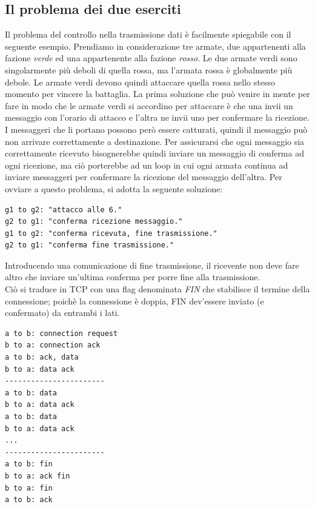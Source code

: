 \subsection{Il problema dei due eserciti}
Il problema del controllo nella trasmissione dati è facilmente spiegabile con il seguente esempio.
Prendiamo in considerazione tre armate, due appartenenti alla fazione \textit{verde} ed una appartenente alla fazione \textit{rosso}. Le due armate verdi sono singolarmente più deboli di quella rossa, ma l'armata rossa è globalmente più debole. Le armate verdi devono quindi attaccare quella rossa nello stesso momento per vincere la battaglia. La prima soluzione che può venire in mente per fare in modo che le armate verdi si accordino per attaccare è che una invii un messaggio con l'orario di attacco e l'altra ne invii uno per confermare la ricezione.\\
I messaggeri che li portano possono però essere catturati, quindi il messaggio può non arrivare correttamente a destinazione. Per assicurarsi che ogni messaggio sia correttamente ricevuto bisognerebbe quindi inviare un messaggio di conferma ad ogni ricezione, ma ciò porterebbe ad un loop in cui ogni armata continua ad inviare messaggeri per confermare la ricezione del messaggio dell'altra.
Per ovviare a questo problema, si adotta la seguente soluzione:
\begin{lstlisting}
g1 to g2: "attacco alle 6."
g2 to g1: "conferma ricezione messaggio."
g1 to g2: "conferma ricevuta, fine trasmissione."
g2 to g1: "conferma fine trasmissione."
\end{lstlisting}
Introducendo una comunicazione di fine trasmissione, il ricevente non deve fare altro che inviare un'ultima conferma per porre fine alla trasmissione.\\
Ciò si traduce in TCP con una flag denominata \textit{FIN} che stabilisce il termine della connessione; poichè la connessione è doppia, FIN dev'essere inviato (e confermato) da entrambi i lati.

\begin{lstlisting}
a to b: connection request
b to a: connection ack
a to b: ack, data
b to a: data ack
-----------------------
a to b: data
b to a: data ack
a to b: data
b to a: data ack
...
-----------------------
a to b: fin
b to a: ack fin
b to a: fin
a to b: ack
\end{lstlisting}


